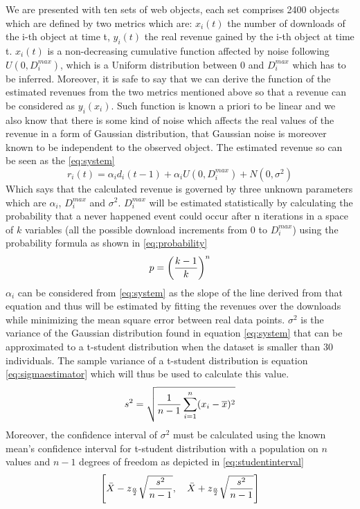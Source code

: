 \documentclass[conference]{IEEEtran}
\begin{document}
We are presented with ten sets of web objects, each set comprises 2400 objects which are defined by two metrics which are: \(x_i(t)\) the number of downloads of the i-th object at time t, \(y_i(t)\) the real revenue gained by the i-th object at time t. \(x_i(t)\) is a non-decreasing cumulative function affected by noise following \(U(0,D_i^{max})\), which is a Uniform distribution between 0 and \( D_i^{max}\) which has to be inferred. 
Moreover, it is safe to say that we can derive the function of the estimated revenues from the two metrics mentioned above so that a revenue can be considered as \(y_i(x_i)\). Such function is known a priori to be linear and we also know that there is some kind of noise which affects the real values of the revenue in a form of Gaussian distribution, that Gaussian noise is moreover known to be independent to the observed object. The estimated revenue so can be seen as the \cref{eq:system}
\begin{equation}
    r_i(t) = \alpha_id_i(t-1) + \alpha_iU(0,D_i^{max}) + N(0,\sigma^2)\label{eq:system}
\end{equation}
Which says that the calculated revenue is governed by three unknown parameters which are \(\alpha_i\), \(D_i^{max}\) and \(\sigma^2\).
\(D_i^{max}\) will be estimated statistically by calculating the probability that a never happened event could occur after n iterations in a space of \(k\) variables (all the possible download increments from \(0\) to \(D_i^{max}\)) using the probability formula as shown in \cref{eq:probability}
\begin{equation}
    p = \left({k-1 \over k}\right)^n\label{eq:probability}
\end{equation}
\(\alpha_i\) can be considered from \cref{eq:system} as the slope of the line derived from that equation and thus will be estimated by fitting the revenues over the downloads while minimizing the mean square error between real data points.
\(\sigma^2\) is the variance of the Gaussian distribution found in equation \cref{eq:system} that can be approximated to a t-student distribution when the dataset is smaller than 30 individuals. The sample variance of a t-student distribution is equation \cref{eq:sigmaestimator} which will thus be used to calculate this value.
\begin{equation}
    s^2 = \sqrt{{1 \over n-1}\sum_{i=1}^n(x_i-\overline{x})^2}\label{eq:sigmaestimator}
\end{equation}
Moreover, the confidence interval of \(\sigma^2\) must be calculated using the known mean’s confidence interval for t-student distribution with a population on \(n\) values and \(n-1\) degrees of freedom as depicted in \cref{eq:studentinterval}
\begin{equation}
    \left[\bar{X} - z_{\alpha \over 2}\sqrt{s^2 \over n-1},\quad \bar{X} + z_{\alpha \over 2}\sqrt{s^2 \over n-1}\right]\label{eq:studentinterval}
\end{equation}
\end{document}
